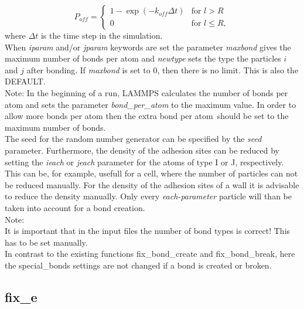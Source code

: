 \documentclass[a4paper,10pt]{scrreprt}
\begin{document}
\begin{equation}
P_{off}  = 
\begin{cases}

1 - \exp(-k_{off}\Delta t) & \text{for } l > R\\
 0  & \text{for } l \le R,

\end{cases}
\end{equation}
where $\Delta t$ is the time step in the simulation.
\\[2ex]
When \textit{iparam} and/or \textit{jparam} keywords are set the parameter \textit{maxbond} gives the maximum number of bonds per atom and \textit{newtype} sets the type the particles $i$ and $j$ after bonding.
If \textit{maxbond} is set to 0, then there is no limit. 
This is also the DEFAULT.\\
Note: In the beginning of a run, LAMMPS calculates the number of bonds per atom and sets the parameter \textit{bond\_per\_atom} to the maximum value.
In order to allow more bonds per atom then the \glqq extra bond per atom\grqq\ should be set to the maximum number of bonds. 
\\[2ex]
The seed for the random number generator can be specified by the \textit{seed} parameter.
Furthermore, the density of the adhesion sites can be reduced by setting the \textit{ieach} or \textit{jeach} parameter for the atoms of type I or J, respectively.
This can be, for example, usefull for a cell, where the number of particles can not be reduced manually.
For the density of the adhesion sites of a wall it is advisable to reduce the density manually.
Only every \textit{each-parameter} particle will than be taken into account for a bond creation.
\\[2ex]
Note:\\[1ex]
It is important that in the input files the number of bond types is correct! This has to be set manually.
\\[1ex]
In contrast to the existing functions fix\_bond\_create and fix\_bond\_break, here the special\_bonds settings are not changed if a bond is created or broken. 


\subsection{fix\_e}

% 
\end{document}
